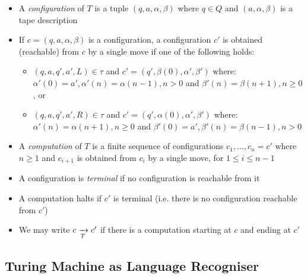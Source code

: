 \begin{itemize}
	\item A \textit{configuration} of $ T $ is a tuple $ (q, a, \alpha, \beta) $ where $ q \in Q $ and $ (a, \alpha, \beta) $ is a tape description
	
	\item If $ c = (q, a, \alpha, \beta) $ is a configuration, a configuration $ c' $ is obtained (reachable) from $ c $ by a single move if one of the following holds:
	
	\begin{itemize}
		\item $ (q, a, q', a', L) \in \tau $ and $ c' = (q', \beta(0), \alpha', \beta') $ where:
		$ \alpha'(0) = a', \alpha'(n) = \alpha(n - 1), n > 0 $ and $ \beta'(n) = \beta(n + 1), n \ge 0 $, or
		
		\item $ (q, a, q', a', R) \in \tau $ and $ c' = (q', \alpha(0), \alpha', \beta') $ where:
		$ \alpha'(n) = \alpha(n + 1), n \ge 0 $ and $\beta'(0) = a', \beta'(n) = \beta(n - 1), n > 0 $
	\end{itemize}

	\item A \textit{computation} of $ T $ is a finite sequence of configurations $ c_1, \dots, c_n = c' $ where $ n \ge 1 $ and $ c_{i+1} $ is obtained from $ c_i $ by a single move, for $ 1 \le i \le n - 1 $
	
	\item A configuration is \textit{terminal} if no configuration is reachable from it
	
	\item A computation halts if $ c' $ is terminal (i.e. there is no configuration reachable from $ c' $)
	
	\item We may write $ c \xrightarrow[T]{} c' $ if there is a computation starting at $ c $ and ending at $ c' $
	
\end{itemize}

\subsection{Turing Machine as Language Recogniser}


